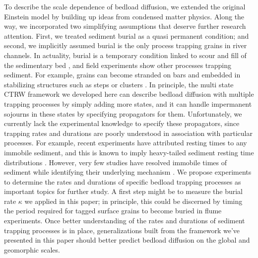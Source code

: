 \documentclass[draft,grl]{agujournal2018}
\begin{document}
To describe the scale dependence of bedload diffusion, we extended the original Einstein model by building up ideas from condensed matter physics.
Along the way, we incorporated two simplifying assumptions that deserve further research attention. 
First, we treated sediment burial as a quasi permanent condition; and second, we implicitly assumed burial is the only process trapping grains in river channels.
In actuality, burial is a temporary condition linked to scour and fill of the sedimentary bed \citep{Hassan1994,Voepel2013,Martin2014}, and field experiments show other processes trapping sediment.
For example, grains can become stranded on bars \citep{Ferguson2002,Bradley2017} and embedded in stabilizing structures such as steps or clusters \citep[e.g.][]{Church1998,Hassan2008}.
In principle, the multi state CTRW framework we developed here can describe bedload diffusion with multiple trapping processes by simply adding more states, and it can handle impermanent sojourns in these states by specifying propagators for them.
Unfortunately, we currently lack the experimental knowledge to specify these propagators, since trapping rates and durations are poorly understood in association with particular processes.
For example, recent experiments have attributed resting times to any immobile sediment, and this is known to imply heavy-tailed sediment resting time distributions \citep[e.g.,][]{Olinde2015,Bradley2017}.
However, very few studies have resolved immobile times of sediment while identifying their underlying mechanism \citep[e.g.,][]{Martin2014}.
We propose experiments to determine the rates and durations of specific bedload trapping processes as important topics for further study.
A first step might be to measure the burial rate $\kappa$ we applied in this paper; in principle, this could be discerned by timing the period required for tagged surface grains to become buried in flume experiments.
Once better understanding of the rates and durations of sediment trapping processes is in place, generalizations built from the framework we've presented in this paper should better predict bedload diffusion on the global and geomorphic scales.
\end{document}
